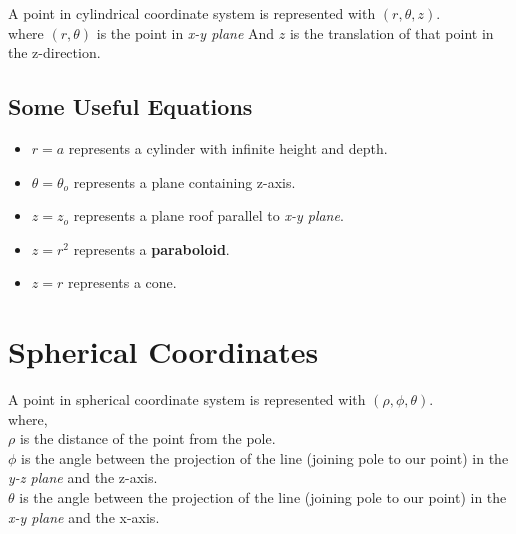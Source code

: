A point in cylindrical coordinate system is represented with
\((r,\theta,z)\).\\
where \((r,\theta)\) is the point in \emph{x-y plane} And \(z\) is the
translation of that point in the z-direction.


\subsection{Some Useful Equations}
\label{ssec:some-useful-equations}
\begin{itemize}
  \item \(r=a\) represents a cylinder with infinite height and depth.\\
  \item \(\theta=\theta_o\) represents a plane containing z-axis.\\
  \item \(z=z_o\) represents a plane roof parallel to \emph{x-y plane}.
  \item \(z=r^2\) represents a \textbf{paraboloid}. 
  \item \(z=r\) represents a cone.
\end{itemize}

\section{Spherical Coordinates}
\label{sec:spherical-coordinates}

A point in spherical coordinate system is represented with
\((\rho,\phi,\theta)\).\\
where,\\
\(\rho\) is the distance of the point from the pole.\\
\(\phi\) is the angle between the projection of the line (joining pole to our
point) in the \emph{y-z plane} and the z-axis.\\
\(\theta\) is the angle between the projection of the line (joining pole to
our point) in the \emph{x-y plane} and the x-axis.



